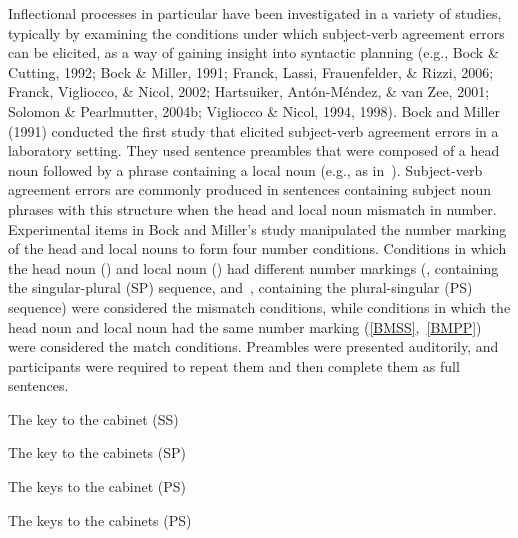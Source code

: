 \documentclass[12pt,titlepage]{article}
\newcommand{\itt}{\textit}  %
\newcommand{\IGNORE}[1]{} %
\begin{document}
Inflectional processes in particular have been investigated in a variety of
studies, typically by examining the conditions under which subject-verb
agreement errors can be elicited, as a way of gaining insight into
syntactic planning (e.g., Bock \& Cutting, 1992; Bock \& Miller, 1991;
Franck, Lassi, Frauenfelder, \& Rizzi, 2006; Franck, Vigliocco, \& Nicol,
2002; Hartsuiker, Ant\'{o}n-M\'{e}ndez, \& van Zee, 2001; Solomon \&
Pearlmutter, 2004b; Vigliocco \& Nicol, 1994, 1998).  Bock and Miller
(1991) conducted the first study that elicited subject-verb agreement
errors in a laboratory setting.  They used sentence preambles that were
composed of a head noun followed by a phrase containing a local noun (e.g.,
as in~).  Subject-verb agreement errors are commonly produced in
sentences containing subject noun phrases with this structure when the head
and local noun mismatch in number\IGNORE{, an effect referred to as
\itt{attraction} or \itt{proximity concord}}.  Experimental items in Bock
and Miller's study manipulated the number marking of the head and local
nouns to form four number conditions.  Conditions in which the head noun
() and local noun () had different number markings
(, containing the singular-plural (SP) sequence,
and~, containing the plural-singular (PS) sequence) were
considered the mismatch conditions, while conditions in which the head noun
and local noun had the same number marking (\ref{BMSS},~\ref{BMPP}) were
considered the match conditions.  Preambles were presented auditorily, and
participants were required to repeat them and then complete them as full
sentences.

\begin{myexample}
\label{BM}
\begin{examples}
    
    \item \label{BMSS} The key to the cabinet \hfill (SS)\hspace{22em}
    
    \item \label{BMSP} The key to the cabinets \hfill (SP)\hspace{22em}
    
    \item \label{BMPS} The keys to the cabinet \hfill (PS)\hspace{22em}

    \item \label{BMPP} The keys to the cabinets \hfill (PS)\hspace{22em}
    
\end{examples}
\end{myexample}
\end{document}
